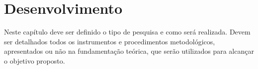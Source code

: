 \chapter{Desenvolvimento} \label{desenvolvimento}


Neste capítulo deve ser definido o tipo de pesquisa e como será realizada. Devem ser detalhados todos os instrumentos e procedimentos metodológicos, apresentados ou não na fundamentação teórica, que serão utilizados para alcançar o objetivo proposto. 
